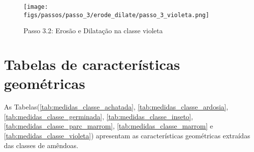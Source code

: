 \begin{anexosenv}
\begin{figure}[hbtp!]
 \centering
 \caption{Passo 3.2: Erosão e Dilatação na classe violeta}
 \texttt{[image: figs/passos/passo\_3/erode\_dilate/passo\_3\_violeta.png]}
 \label{fig:passo_3.2_violeta}
\end{figure}

\newpage
\chapter{Tabelas de características geométricas}
As Tabelas(\ref{tab:medidas_classe_achatada}, \ref{tab:medidas_classe_ardosia}, \ref{tab:medidas_classe_germinada}, \ref{tab:medidas_classe_inseto}, \ref{tab:medidas_classe_parc_marrom}, \ref{tab:medidas_classe_marrom} e \ref{tab:medidas_classe_violeta}) apresentam as características geométricas extraídas das classes de amêndoas.


\end{anexosenv}
